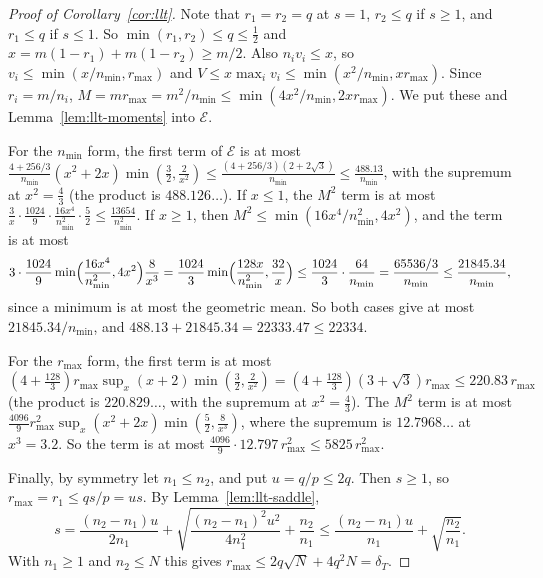 \begin{proof}[Proof of Corollary~\ref{cor:llt}]
Note that $r_1=r_2=q$ at $s=1$, $r_2\le q$ if $s\ge1$, and $r_1\le q$ if $s\le1$. So
$\min(r_1,r_2)\le q\le\frac12$ and $x=m(1-r_1)+m(1-r_2)\ge m/2$. Also $n_iv_i\le x$, so
$v_i\le\min(x/n_{\min},r_{\max})$ and $V\le x\max_iv_i\le\min(x^2/n_{\min},xr_{\max})$. Since
$r_i=m/n_i$, $M=mr_{\max}=m^2/n_{\min}\le\min(4x^2/n_{\min},2xr_{\max})$. We put these and
Lemma~\ref{lem:llt-moments} into $\mathcal E$.

For the $n_{\min}$ form, the first term of $\mathcal E$ is at most
$\frac{4+256/3}{n_{\min}}(x^2+2x)\min(\frac32,\frac2{x^2})\le\frac{(4+256/3)(2+2\sqrt3)}{n_{\min}}
\le\frac{488.13}{n_{\min}}$, with the supremum at $x^2=\frac43$ (the product is $488.126\ldots$).
If $x\le1$, the $M^2$ term is at most
$\frac3x\cdot\frac{1024}9\cdot\frac{16x^4}{n_{\min}^2}\cdot\frac52\le\frac{13654}{n_{\min}^2}$. If
$x\ge1$, then $M^2\le\min(16x^4/n_{\min}^2,4x^2)$, and the term is at most
\[
3\cdot\frac{1024}9\min\Bigl(\frac{16x^4}{n_{\min}^2},4x^2\Bigr)\frac8{x^3}
=\frac{1024}3\min\Bigl(\frac{128x}{n_{\min}^2},\frac{32}x\Bigr)\le\frac{1024}3\cdot\frac{64}{n_{\min}}
=\frac{65536/3}{n_{\min}}\le\frac{21845.34}{n_{\min}},
\]
since a minimum is at most the geometric mean. So both cases give at most
$21845.34/n_{\min}$, and $488.13+21845.34=22333.47\le22334$.

For the $r_{\max}$ form, the first term is at most
$(4+\frac{128}3)r_{\max}\sup_x(x+2)\min(\frac32,\frac2{x^2})=(4+\frac{128}3)(3+\sqrt3)r_{\max}
\le220.83\,r_{\max}$ (the product is $220.829\ldots$, with the supremum at $x^2=\frac43$). The
$M^2$ term is at most $\frac{4096}9r_{\max}^2\sup_x(x^2+2x)\min(\frac52,\frac8{x^3})$, where the
supremum is $12.7968\ldots$ at $x^3=3.2$. So the term is at most
$\frac{4096}9\cdot12.797\,r_{\max}^2\le5825\,r_{\max}^2$.

Finally, by symmetry let $n_1\le n_2$, and put $u=q/p\le2q$. Then $s\ge1$, so
$r_{\max}=r_1\le qs/p=us$. By Lemma~\ref{lem:llt-saddle},
\[
s=\frac{(n_2-n_1)u}{2n_1}+\sqrt{\frac{(n_2-n_1)^2u^2}{4n_1^2}+\frac{n_2}{n_1}}
\le\frac{(n_2-n_1)u}{n_1}+\sqrt{\frac{n_2}{n_1}}.
\]
With $n_1\ge1$ and $n_2\le N$ this gives $r_{\max}\le2q\sqrt N+4q^2N=\delta_T$.
\end{proof}

